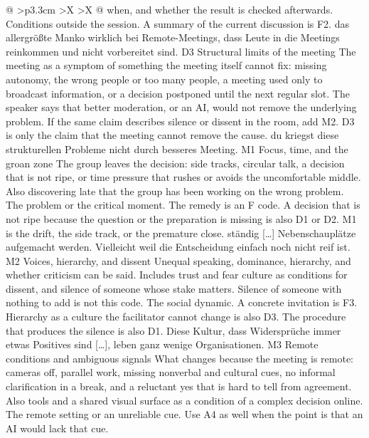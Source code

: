 \begin{xltabular}{\textwidth}{@{}
    >{\RaggedRight\arraybackslash}p{3.3cm}
    >{\RaggedRight\arraybackslash}X
    >{\RaggedRight\arraybackslash}X
  @{}}
{  when, and whether the result is checked afterwards.}
  {Conditions outside the session. A summary of the current discussion is F2.}
  {das allergrößte Manko wirklich bei Remote-Meetings, dass Leute in die Meetings reinkommen
  und nicht vorbereitet sind.}
  \cbgap
  \cbrow
  {D3}
  {Structural limits of the meeting}
  {The meeting as a symptom of something the meeting itself cannot fix: missing autonomy,
    the wrong people or too many people, a meeting used only to broadcast information, or a
  decision postponed until the next regular slot.}
  {The speaker says that better moderation, or an AI, would not remove the underlying
  problem. If the same claim describes silence or dissent in the room, add M2.
  D3 is only the claim that the meeting cannot remove the cause.}
  {du kriegst diese strukturellen Probleme nicht durch besseres Meeting.}
  \cbcatbreak
  \cbrow
  {M1}
  {Focus, time, and the groan zone}
  {The group leaves the decision: side tracks, circular talk, a decision that is not ripe,
    or time pressure that rushes or avoids the uncomfortable middle. Also discovering late that
  the group has been working on the wrong problem.}
  {The problem or the critical moment. The remedy is an F code.
  A decision that is not ripe because the question or the preparation is missing is also
  D1 or D2. M1 is the drift, the side track, or the premature close.}
  {ständig [\ldots] Nebenschauplätze aufgemacht werden. Vielleicht weil die Entscheidung
  einfach noch nicht reif ist.}
  \cbgap
  \cbrow
  {M2}
  {Voices, hierarchy, and dissent}
  {Unequal speaking, dominance, hierarchy, and whether criticism can be said. Includes trust
    and fear culture as conditions for dissent, and silence of someone whose stake matters.
  Silence of someone with nothing to add is not this code.}
  {The social dynamic. A concrete invitation is F3.
  Hierarchy as a culture the facilitator cannot change is also D3.
  The procedure that produces the silence is also D1.}
  {Diese Kultur, dass Widersprüche immer etwas Positives sind [\ldots], leben ganz wenige
  Organisationen.}
  \cbgap
  \cbrow
  {M3}
  {Remote conditions and ambiguous signals}
  {What changes because the meeting is remote: cameras off, parallel work, missing nonverbal
    and cultural cues, no informal clarification in a break, and a reluctant yes that is hard
    to tell from agreement. Also tools and a shared visual surface as a condition of a complex
  decision online.}
  {The remote setting or an unreliable cue. Use A4 as well when the point is that an AI would
  lack that cue.}

\end{xltabular}
